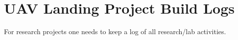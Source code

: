 
\chapter{UAV Landing Project Build Logs}

For research projects one needs to keep a log of all research/lab activities.   


\newpage

\newpage

\newpage

\newpage

